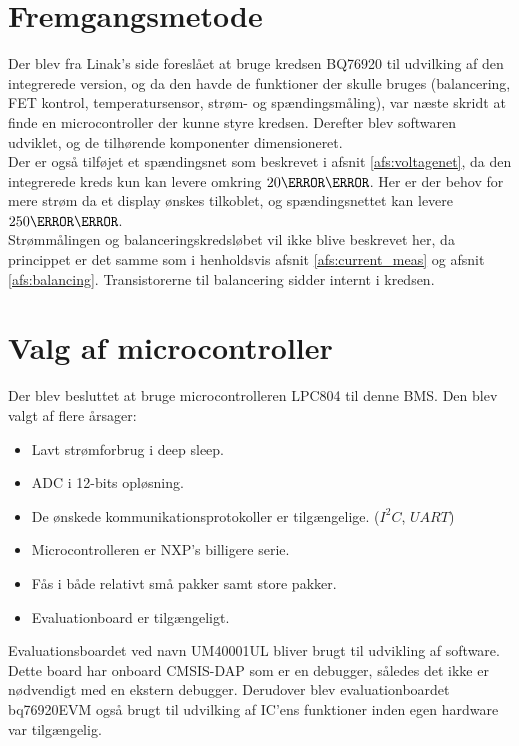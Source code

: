 \section{Fremgangsmetode}

Der blev fra Linak's side foreslået at bruge kredsen BQ76920 til udvilking af den integrerede version, og da den havde de funktioner der skulle bruges (balancering, FET kontrol, temperatursensor, strøm- og spændingsmåling), var næste skridt at finde en microcontroller der kunne styre kredsen. Derefter blev softwaren udviklet, og de tilhørende komponenter dimensioneret. \\

Der er også tilføjet et spændingsnet som beskrevet i afsnit \ref{afs:voltagenet}, da den integrerede kreds kun kan levere omkring $20\milli\ampere$. Her er der behov for mere strøm da et display ønskes tilkoblet, og spændingsnettet kan levere $250\milli\ampere$. \\

Strømmålingen og balanceringskredsløbet vil ikke blive beskrevet her, da princippet er det samme som i henholdsvis afsnit \ref{afs:current_meas} og afsnit \ref{afs:balancing}. Transistorerne til balancering sidder internt i kredsen. 
\section{Valg af microcontroller}\label{afs:valg_af_uc}
Der blev besluttet at bruge microcontrolleren LPC804 til denne BMS. Den blev valgt af flere årsager:

\begin{itemize}[noitemsep]
	\item Lavt strømforbrug i deep sleep.
	\item ADC i 12-bits opløsning.
	\item De ønskede kommunikationsprotokoller er tilgængelige. ($I^2C$, $UART$)
	\item Microcontrolleren er NXP's billigere serie.
	\item Fås i både relativt små pakker samt store pakker.
	\item Evaluationboard er tilgængeligt.
\end{itemize}

Evaluationsboardet ved navn UM40001UL bliver brugt til udvikling af software. Dette board har onboard CMSIS-DAP som er en debugger, således det ikke er nødvendigt med en ekstern debugger. Derudover blev evaluationboardet bq76920EVM også brugt til udvilking af IC'ens funktioner inden egen hardware var tilgængelig. 

